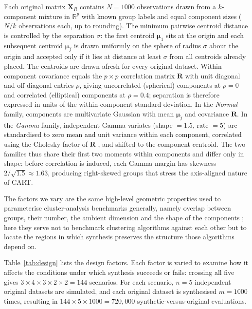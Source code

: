 \documentclass[pdflatex,referee]{sn-jnl}
\newcommand{\bX}{\mathbf{X}}
\newcommand{\bmu}{\boldsymbol{\mu}}
\newcommand{\bR}{\mathbf{R}}
\begin{document}
Each original matrix $\bX_R$ contains $N = 1000$ observations drawn from a
$k$-component mixture in $\mathbb{R}^p$ with known group labels and equal
component sizes ($N/k$ observations each, up to rounding). The minimum pairwise
centroid distance is controlled by the separation $\sigma$: the first centroid
$\bmu_1$ sits at the origin and each subsequent centroid $\bmu_j$ is drawn
uniformly on the sphere of radius $\sigma$ about the origin and accepted only
if it lies at distance at least $\sigma$ from all centroids already placed.
The centroids are drawn afresh for every original dataset. Within-component
covariance equals the $p \times p$ correlation matrix $\bR$ with unit diagonal
and off-diagonal entries $\rho$, giving uncorrelated (spherical) components at
$\rho = 0$ and correlated (elliptical) components at $\rho = 0.4$; separation
is therefore expressed in units of the within-component standard deviation. In
the \emph{Normal} family, components are multivariate Gaussian with mean
$\bmu_j$ and covariance $\bR$. In the \emph{Gamma} family, independent Gamma
variates (shape $=1.5$, rate $=5$) are standardised to zero mean and unit
variance within each component, correlated using the Cholesky factor of $\bR$
\citep[chap.~4]{johnson1987}, and shifted to the component centroid. The two
families thus share their first two moments within components and differ only
in shape: before correlation is induced, each Gamma margin has skewness
$2/\sqrt{1.5} \approx 1.63$, producing right-skewed groups that stress the
axis-aligned nature of CART.

The factors we vary are the same high-level geometric properties used to
parameterise cluster-analysis benchmarks generally, namely overlap between
groups, their number, the ambient dimension and the shape of the components
\citep{qiu2006,zellinger2025}; here they serve not to benchmark clustering
algorithms against each other but to locate the regions in which synthesis
preserves the structure those algorithms depend on.

Table~\ref{tab:design} lists the design factors. Each factor is varied to
examine how it affects the conditions under which synthesis succeeds or fails:
crossing all five gives $3 \times 4 \times 3 \times 2 \times 2 = 144$
scenarios. For each scenario, $n = 5$ independent original datasets are
simulated, and each original dataset is synthesised $m = 1000$ times, resulting
in $144 \times 5 \times 1000 = 720{,}000$ synthetic-versus-original
evaluations.
\end{document}
